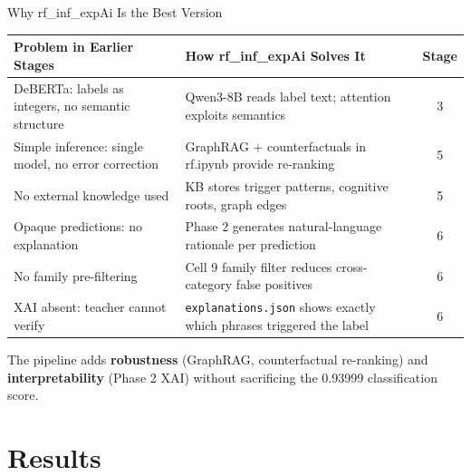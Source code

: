 \documentclass[aspectratio=169]{beamer}
\begin{document}
\begin{frame}{Why rf\_inf\_expAi Is the Best Version}
\small
\setlength{\tabcolsep}{4pt}
\renewcommand{\arraystretch}{1.3}
\begin{center}
\begin{tabular}{p{4.2cm}p{5.5cm}c}
\toprule
\textbf{Problem in Earlier Stages} & \textbf{How rf\_inf\_expAi Solves It} & \textbf{Stage}\\
\midrule
\rowcolor{RowTintA}
DeBERTa: labels as integers, no semantic structure & Qwen3-8B reads label text; attention exploits semantics & 3\\
\rowcolor{RowTintB}
Simple inference: single model, no error correction & GraphRAG + counterfactuals in rf.ipynb provide re-ranking & 5\\
\rowcolor{RowTintA}
No external knowledge used & KB stores trigger patterns, cognitive roots, graph edges & 5\\
\rowcolor{RowTintB}
Opaque predictions: no explanation & Phase 2 generates natural-language rationale per prediction & 6\\
\rowcolor{RowTintA}
No family pre-filtering & Cell 9 family filter reduces cross-category false positives & 6\\
\rowcolor{RowTintB}
XAI absent: teacher cannot verify & \texttt{explanations.json} shows exactly which phrases triggered the label & 6\\
\bottomrule
\end{tabular}
\end{center}
\vspace{6pt}
\begin{center}
\begin{block}{}
\centering
The pipeline adds \textbf{robustness} (GraphRAG, counterfactual re-ranking) and \textbf{interpretability} (Phase 2 XAI) without sacrificing the 0.93999 classification score.
\end{block}
\end{center}
\end{frame}

\section{Results}
\end{document}
